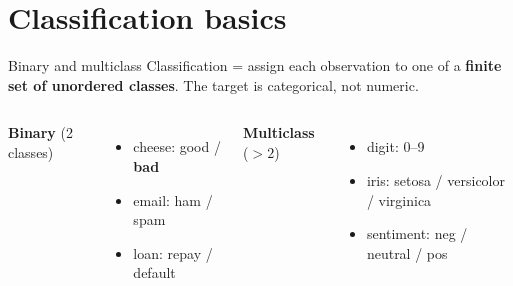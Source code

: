 \documentclass[aspectratio=169]{beamer}
\begin{document}
\section{Classification basics}

\begin{frame}{Binary and multiclass}
  Classification = assign each observation to one of a \textbf{finite set of unordered
  classes}. The target is categorical, not numeric.
  \vfill
  \begin{columns}[T]
    \textbf{Binary} (2 classes)
    \begin{itemize}\small
      \item cheese: good / \textbf{bad}
      \item email: ham / spam
      \item loan: repay / default
    \end{itemize}
    \textbf{Multiclass} ($> 2$)
    \begin{itemize}\small
      \item digit: 0--9
      \item iris: setosa / versicolor / virginica
      \item sentiment: neg / neutral / pos
    \end{itemize}
  \end{columns}
  \vfill
\end{frame}
\end{document}
